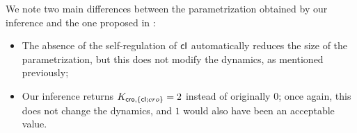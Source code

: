 We note two main differences between the parametrization obtained by our inference
and the one proposed in \cite{thieffry_dynamical_1995}:
\begin{itemize}
  \item The absence of the self-regulation of $\mathsf{cI}$ automatically reduces the size
    of the parametrization, but this does not modify the dynamics, as mentioned previously;
  \item Our inference returns $K_{\mathsf{cro}, \{\mathsf{cI};cro\}} = 2$ instead of originally $0$;
    once again, this does not change the dynamics, and $1$ would also have been
    an acceptable value.
\end{itemize}
